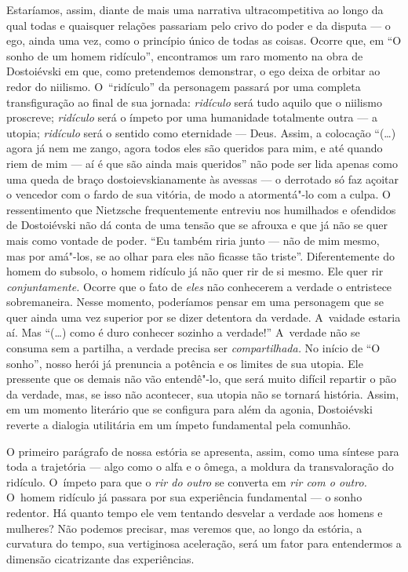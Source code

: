 Estaríamos, assim, diante de mais uma narrativa ultracompetitiva ao
longo da qual todas e quaisquer relações passariam pelo crivo do poder e
da disputa --- o ego, ainda uma vez, como o princípio único de todas as
coisas. Ocorre que, em ``O sonho de um homem ridículo'', encontramos um
raro momento na obra de Dostoiévski em que, como pretendemos demonstrar,
o ego deixa de orbitar ao redor do niilismo. O~``ridículo'' da
personagem passará por uma completa transfiguração ao final de sua
jornada: \emph{ridículo} será tudo aquilo que o niilismo proscreve;
\emph{ridículo} será o ímpeto por uma humanidade totalmente outra --- a
utopia; \emph{ridículo} será o sentido como eternidade --- Deus. Assim, a
colocação ``(\ldots{}) agora já nem me zango, agora todos eles são
queridos para mim, e até quando riem de mim --- aí é que são ainda mais
queridos'' não pode ser lida apenas como uma queda de braço
dostoievskianamente às avessas --- o derrotado só faz açoitar o vencedor
com o fardo de sua vitória, de modo a atormentá"-lo com a culpa. O
ressentimento que Nietzsche frequentemente entreviu nos humilhados e
ofendidos de Dostoiévski não dá conta de uma tensão que se afrouxa e que
já não se quer mais como vontade de poder. ``Eu também riria junto ---
não de mim mesmo, mas por amá"-los, se ao olhar para eles não ficasse tão
triste''. Diferentemente do homem do subsolo, o homem ridículo já não
quer rir de si mesmo. Ele quer rir \emph{conjuntamente.} Ocorre que o
fato de \emph{eles} não conhecerem a verdade o entristece sobremaneira.
Nesse momento, poderíamos pensar em uma personagem que se quer ainda uma
vez superior por se dizer detentora da verdade. A~vaidade estaria aí.
Mas ``(\ldots) como é duro conhecer sozinho a verdade!'' A~verdade não se
consuma sem a partilha, a verdade precisa ser \emph{compartilhada.} No
início de ``O sonho'', nosso herói já prenuncia a potência e os limites
de sua utopia. Ele pressente que os demais não vão entendê"-lo, que será
muito difícil repartir o pão da verdade, mas, se isso não acontecer, sua
utopia não se tornará história. Assim, em um momento literário que se
configura para além da agonia, Dostoiévski reverte a dialogia utilitária
em um ímpeto fundamental pela comunhão.

O primeiro parágrafo de nossa estória se apresenta, assim, como uma
síntese para toda a trajetória --- algo como o alfa e o ômega, a moldura
da transvaloração do ridículo. O~ímpeto para que o \emph{rir do outro}
se converta em \emph{rir com o outro.} O~homem ridículo já passara por
sua experiência fundamental --- o sonho redentor. Há quanto tempo ele vem
tentando desvelar a verdade aos homens e mulheres? Não podemos precisar,
mas veremos que, ao longo da estória, a curvatura do tempo, sua
vertiginosa aceleração, será um fator para entendermos a dimensão
cicatrizante das experiências.

